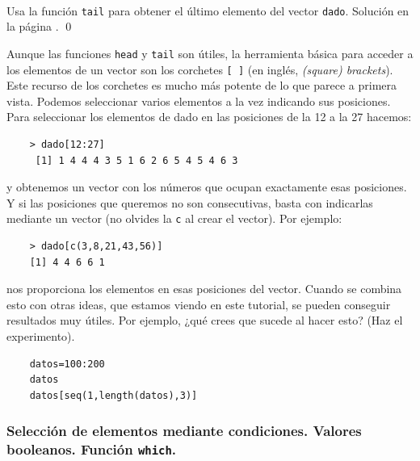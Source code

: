 \documentclass[10pt,a4paper]{article}\usepackage[]{graphicx}\usepackage[]{color}
\begin{document}
\begin{ejercicio}
\label{tut02:ejercicio24}
\quad\\
Usa la función {\tt tail} para obtener el último elemento del vector {\tt dado}. Solución en la página \pageref{tut02:ejercicio24:sol}.
\qed
\end{ejercicio}

Aunque las funciones {\tt head} y {\tt tail} son útiles, la herramienta básica para acceder a los elementos de un vector son los corchetes {\tt [\,]} (en inglés, {\em (square) brackets}). Este recurso de los corchetes es mucho más potente de lo que parece a primera vista. Podemos seleccionar varios elementos a la vez indicando sus posiciones. Para seleccionar los elementos de dado en las posiciones de la 12 a la 27 hacemos:
\begin{verbatim}
    > dado[12:27]
     [1] 1 4 4 4 3 5 1 6 2 6 5 4 5 4 6 3
\end{verbatim}
y obtenemos un vector con los números que ocupan exactamente esas posiciones. Y si las posiciones que queremos no son consecutivas, basta con indicarlas mediante un vector (no olvides la {\tt c} al crear el vector). Por ejemplo:
\begin{verbatim}
    > dado[c(3,8,21,43,56)]
    [1] 4 4 6 6 1
\end{verbatim}
nos proporciona los elementos en esas posiciones del vector. Cuando se combina esto con otras ideas, que estamos viendo en este tutorial, se pueden conseguir resultados muy útiles. Por ejemplo, ¿qué crees que sucede al hacer esto? (Haz el experimento).
\begin{verbatim}
    datos=100:200
    datos
    datos[seq(1,length(datos),3)]
\end{verbatim}

\subsubsection*{Selección de elementos mediante condiciones. Valores booleanos. Función {\tt which}.}
\label{tut02:subsubsec:SeleccionElementosCondicionesValoresBooleanosWhich}
\end{document}
